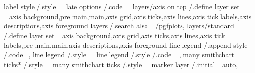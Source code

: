 {{{{{{{{{{{{{{{{{{{{{{{{{{label style                                  /.style                                                                                   ={%
late options                                 /.code                                                                                    ={%
layers/axis on top                           /.define layer set                                                                        ={axis background,pre main,main,axis grid,axis ticks,axis lines,axis tick labels,axis descriptions,axis foreground}{
layers                                       /.search also                                                                             =/pgfplots,                                                                                                         
layers/standard                              /.define layer set                                                                        ={axis background,axis grid,axis ticks,axis lines,axis tick labels,pre main,main,axis descriptions,axis foreground}{
line legend                                  /.append style                                                                      /.code={},%
line legend                                  /.style                                                                                   ={%
line legend                                  /.style  /.code                                                                           ={},%
many smithchart ticks*                       /.style                                                                                   ={                                                                                                                  
many smithchart ticks                        /.style                                                                                   ={                                                                                                                  
marker layer                                 /.initial                                                                                 =auto,                                                                                                              
}}}}}}}}}}}}}}}}}}}}}}}}}}}}}}}}}
